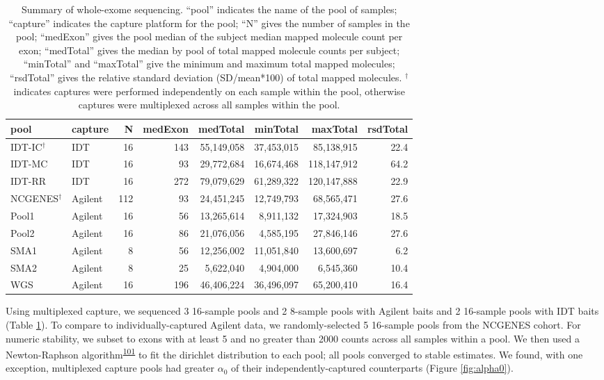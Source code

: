 \documentclass[11pt,letterpaper]{book}
\begin{document}
\begin{table}

\caption[Summary of whole-exome sequencing for CNV project.]{\label{tab:poolSummary}Summary of whole-exome sequencing. ``pool'' indicates the name of the pool of samples; ``capture'' indicates the capture platform for the pool; ``N'' gives the number of samples in the pool; ``medExon'' gives the pool median of the subject median mapped molecule count per exon; ``medTotal'' gives the median by pool of total mapped molecule counts per subject; ``minTotal'' and ``maxTotal'' give the minimum and maximum total mapped molecules; ``rsdTotal'' gives the relative standard deviation (SD/mean*100) of total mapped molecules. \(^\dagger\) indicates captures were performed independently on each sample within the pool, otherwise captures were multiplexed across all samples within the pool.}
\centering
\begin{tabular}[t]{llrrrrrr}
\toprule
pool & capture & N & medExon & medTotal & minTotal & maxTotal & rsdTotal\\
\midrule
IDT-IC$^\dagger$ & IDT & 16 & 143 & 55,149,058 & 37,453,015 & 85,138,915 & 22.4\\
IDT-MC & IDT & 16 & 93 & 29,772,684 & 16,674,468 & 118,147,912 & 64.2\\
IDT-RR & IDT & 16 & 272 & 79,079,629 & 61,289,322 & 120,147,888 & 22.9\\
NCGENES$^\dagger$ & Agilent & 112 & 93 & 24,451,245 & 12,749,793 & 68,565,471 & 27.6\\
Pool1 & Agilent & 16 & 56 & 13,265,614 & 8,911,132 & 17,324,903 & 18.5\\
\addlinespace
Pool2 & Agilent & 16 & 86 & 21,076,056 & 4,585,195 & 27,846,146 & 27.6\\
SMA1 & Agilent & 8 & 56 & 12,256,002 & 11,051,840 & 13,600,697 & 6.2\\
SMA2 & Agilent & 8 & 25 & 5,622,040 & 4,904,000 & 6,545,360 & 10.4\\
WGS & Agilent & 16 & 196 & 46,406,224 & 36,496,097 & 65,200,410 & 16.4\\
\bottomrule
\end{tabular}
\end{table}

Using multiplexed capture, we sequenced 3 16-sample pools and 2 8-sample pools with Agilent baits and 2 16-sample pools with IDT baits (Table \ref{tab:poolSummary}).
To compare to individually-captured Agilent data, we randomly-selected 5 16-sample pools from the NCGENES cohort.
For numeric stability, we subset to exons with at least 5 and no greater than 2000 counts across all samples within a pool.
We then used a Newton-Raphson algorithm\textsuperscript{\protect\hyperlink{ref-minka:2000aa}{101}} to fit the dirichlet distribution to each pool; all pools converged to stable estimates.
We found, with one exception, multiplexed capture pools had greater \(\alpha_0\) of their independently-captured counterparts (Figure \ref{fig:alpha0}).
\end{document}
